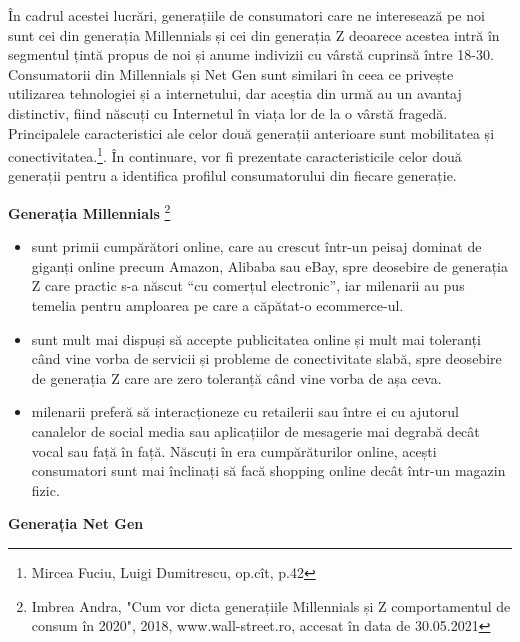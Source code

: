 \documentclass[a4paper, 12pt]{article}
\begin{document}
		\quad În cadrul acestei lucrări, generațiile de consumatori  care ne interesează pe noi sunt cei din generația Millennials și cei din generația Z deoarece acestea intră în segmentul țintă propus de noi și anume indivizii cu vârstă cuprinsă între 18-30. Consumatorii din Millennials și Net Gen sunt similari în ceea ce privește utilizarea tehnologiei și a internetului, dar aceștia din urmă au un avantaj distinctiv, fiind născuți cu Internetul în viața lor de la o vârstă fragedă. Principalele caracteristici ale celor două generații anterioare sunt mobilitatea și conectivitatea.\footnote{Mircea Fuciu, Luigi Dumitrescu, op.cît, p.42}. În continuare, vor fi prezentate caracteristicile celor două generații pentru a identifica profilul consumatorului din fiecare generație.
	\bigskip
	
		\quad\textbf{ Generația Millennials }\footnote{Imbrea Andra, "Cum vor dicta generațiile Millennials și Z comportamentul de consum în 2020", 2018, www.wall-street.ro, accesat în data de 30.05.2021}
		\begin{itemize}
			\item sunt primii cumpărători online, care au crescut într-un peisaj dominat de giganți online precum Amazon, Alibaba sau eBay, spre deosebire de generația Z care practic s-a născut “cu comerțul electronic”, iar milenarii au pus temelia pentru amploarea pe care a căpătat-o ecommerce-ul.
			\item sunt mult mai dispuși să accepte publicitatea online și mult mai toleranți când vine vorba de servicii și probleme de conectivitate slabă, spre deosebire de generația Z care are zero toleranță când vine vorba de așa ceva.
			\item milenarii preferă să interacționeze cu retailerii sau între ei cu ajutorul canalelor de social media sau aplicațiilor de mesagerie mai degrabă decât vocal sau față în față. Născuți în era cumpărăturilor online, acești consumatori sunt mai înclinați să facă shopping online decât într-un magazin fizic. 
		\end{itemize}
		\quad \textbf{Generația Net Gen}
\end{document}
